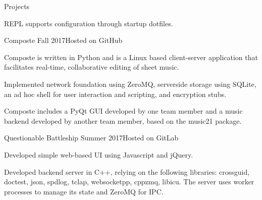 \documentclass{resume} %
\begin{document}
\begin{rSection}{Projects}
\begin{rSubsection}
\item REPL supports configuration through startup dotfiles.

\end{rSubsection}

\begin{rSubsection}
    {Composte}
    {Fall 2017}{Hosted on GitHub}

\item Composte is written in Python and is a Linux based client-server
    application that facilitates real-time, collaborative editing of sheet
    music.

\item Implemented network foundation using ZeroMQ, serverside storage using
    SQLite, an ad hoc shell for user interaction and scripting, and encryption
    stubs.

\item Composte includes a PyQt GUI developed by one team member and a music
    backend developed by another team member, based on the music21 package.

\end{rSubsection}

\begin{rSubsection}
    {Questionable Battleship}
    {Summer 2017}{Hosted on GitLab}


\item Developed simple web-based UI using Javascript and jQuery.

\item Developed backend server in C++, relying on the following libraries:
    crossguid, doctest, json, spdlog, tclap, websocketpp, cppzmq,
    libicu. The server uses worker processes to manage its state and ZeroMQ
    for IPC.

\end{rSubsection}





\end{rSection}
\end{document}
